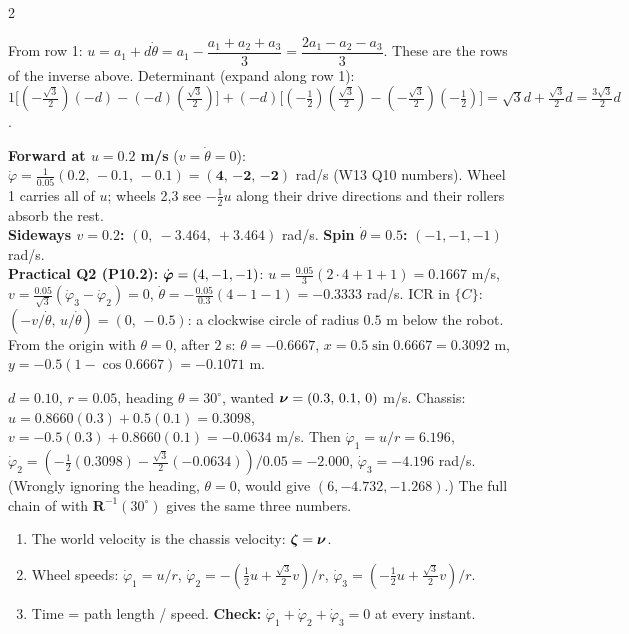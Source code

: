\begin{multicols}{2}
\begin{deriv}
From row 1: $u=a_1+d\dot\theta=a_1-\dfrac{a_1+a_2+a_3}3=\dfrac{2a_1-a_2-a_3}3$.
These are the rows of the inverse above. Determinant (expand along row 1): $1\big[(-\tfrac{\sqrt3}2)(-d)-(-d)(\tfrac{\sqrt3}2)\big]+(-d)\big[(-\tfrac12)(\tfrac{\sqrt3}2)-(-\tfrac{\sqrt3}2)(-\tfrac12)\big]=\sqrt3d+\tfrac{\sqrt3}2d=\tfrac{3\sqrt3}2d$.
\end{deriv}
\begin{worked}[numbers: $d=0.10$ m, $r=0.05$ m \chk]
\textbf{Forward at $u=0.2$ m/s} ($v=\dot\theta=0$): $\dot\varphi=\frac1{0.05}(0.2,\,-0.1,\,-0.1)=(\mathbf{4},\,\mathbf{-2},\,\mathbf{-2})$ rad/s (W13 Q10 numbers). Wheel 1 carries all of $u$; wheels 2,3 see $-\frac12u$ along their drive directions and their rollers absorb the rest.\\
\textbf{Sideways $v=0.2$:} $(0,\ -3.464,\ +3.464)$ rad/s. \textbf{Spin $\dot\theta=0.5$:} $(-1,-1,-1)$ rad/s.\\
\textbf{Practical Q2 (P10.2):} $\dot{\boldsymbol\varphi}=(4,-1,-1)$: $u=\frac{0.05}3(2\cdot4+1+1)=0.1667$ m/s, $v=\frac{0.05}{\sqrt3}(\dot\varphi_3-\dot\varphi_2)=0$, $\dot\theta=-\frac{0.05}{0.3}(4-1-1)=-0.3333$ rad/s. ICR in $\{C\}$: $(-v/\dot\theta,\,u/\dot\theta)=(0,\,-0.5)$: a clockwise circle of radius $0.5$ m below the robot. From the origin with $\theta=0$, after $2$ s: $\theta=-0.6667$, $x=0.5\sin0.6667=0.3092$ m, $y=-0.5(1-\cos0.6667)=-0.1071$ m.
\end{worked}
\begin{worked}
$d=0.10$, $r=0.05$, heading $\theta=30^\circ$, wanted $\boldsymbol\nu=(0.3,\,0.1,\,0)$ m/s. Chassis: $u=0.8660(0.3)+0.5(0.1)=0.3098$, $v=-0.5(0.3)+0.8660(0.1)=-0.0634$ m/s. Then $\dot\varphi_1=u/r=6.196$, $\dot\varphi_2=(-\frac12(0.3098)-\frac{\sqrt3}2(-0.0634))/0.05=-2.000$, $\dot\varphi_3=-4.196$ rad/s. (Wrongly ignoring the heading, $\theta=0$, would give $(6,-4.732,-1.268)$.) The full chain of  with $\mathbf R^{-1}(30^\circ)$ gives the same three numbers.
\end{worked}
\begin{recipe}[omni robot following a path without rotating ($\dot\theta=0$, $\theta=0$)]
\begin{enumerate}
\item The world velocity is the chassis velocity: $\boldsymbol\zeta=\boldsymbol\nu$.
\item Wheel speeds: $\dot\varphi_1=u/r$, $\dot\varphi_2=-(\tfrac12u+\tfrac{\sqrt3}2v)/r$, $\dot\varphi_3=(-\tfrac12u+\tfrac{\sqrt3}2v)/r$.
\item Time = path length / speed. \textbf{Check:} $\dot\varphi_1+\dot\varphi_2+\dot\varphi_3=0$ at every instant.

\end{enumerate}
\end{recipe}
\end{multicols}
